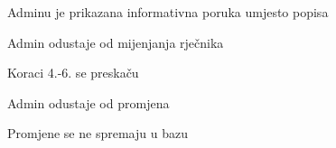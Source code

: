 \begin{packed_item}
\begin{packed_item}
\begin{packed_enum}
			\item Adminu je prikazana informativna poruka umjesto popisa
			\item Admin odustaje od mijenjanja rječnika
			\item Koraci 4.-6. se preskaču
			
		\end{packed_enum}

		\item[5.a] Admin odustaje od promjena
		\item[] \begin{packed_enum}
			
			\item Promjene se ne spremaju u bazu
			
		\end{packed_enum}
		
	\end{packed_item}

\end{packed_item}
					

